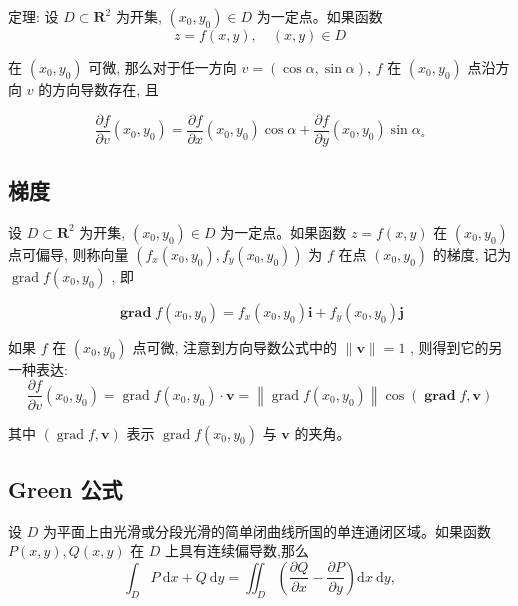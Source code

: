 \documentclass{book}
\begin{document}
定理: 设  $D \subset \mathbf{R}^{2}$  为开集,  $\left(x_{0}, y_{0}\right) \in D$  为一定点。如果函数
\begin{equation}
    z=f(x, y), \quad(x, y) \in D
\end{equation}

在  $\left(x_{0}, y_{0}\right)$  可微, 那么对于任一方向  $v=(\cos \alpha, \sin \alpha)$, $f$  在  $\left(x_{0}, y_{0}\right)$  点沿方向  $v$ 的方向导数存在, 且

\begin{equation}
    \frac{\partial f}{\partial v}\left(x_{0}, y_{0}\right)=\frac{\partial f}{\partial x}\left(x_{0}, y_{0}\right) \cos \alpha+\frac{\partial f}{\partial y}\left(x_{0}, y_{0}\right) \sin \alpha_{\circ}
\end{equation}

\subsection{梯度} 设  $D \subset \mathbf{R}^{2}$  为开集,  $\left(x_{0}, y_{0}\right) \in D$  为一定点。如果函数  $z=   f(x, y)$  在  $\left(x_{0}, y_{0}\right)$  点可偏导, 则称向量  $\left(f_{x}\left(x_{0}, y_{0}\right), f_{y}\left(x_{0}, y_{0}\right)\right)$  为  $f$  在点  $\left(x_{0}\right. ,  \left.y_{0}\right)$  的梯度, 记为  $\operatorname{grad} f\left(x_{0}, y_{0}\right)$ , 即

\begin{equation}
    \boldsymbol{\operatorname { g r a d }} f\left(x_{0}, y_{0}\right)=f_{x}\left(x_{0}, y_{0}\right) \boldsymbol{i}+f_{y}\left(x_{0}, y_{0}\right) \boldsymbol{j}
\end{equation}

如果  $f$  在  $\left(x_{0}, y_{0}\right)$ 点可微, 注意到方向导数公式中的  $\|\boldsymbol{v}\|=1$ , 则得到它的另一种表达:
\begin{equation}
    \frac{\partial f}{\partial v}\left(x_{0}, y_{0}\right)=\operatorname{grad} f\left(x_{0}, y_{0}\right) \cdot \boldsymbol{v}=\left\|\operatorname{grad} f\left(x_{0}, y_{0}\right)\right\| \cos (\boldsymbol{\operatorname { g r a d }} f, \boldsymbol{v})
\end{equation}

其中  $(\operatorname{grad} f, \boldsymbol{v})$  表示  $\operatorname{grad} f\left(x_{0}, y_{0}\right)$  与  $\boldsymbol{v}$  的夹角。

\subsection{Green 公式}
设  $D$  为平面上由光滑或分段光滑的简单闭曲线所国的单连通闭区域。如果函数  $P(x, y), Q(x, y)$  在  $D$  上具有连续偏导数,那么
\begin{equation}
    \int_{D} P \mathrm{~d} x+Q \mathrm{~d} y=\iint_{D}\left(\frac{\partial Q}{\partial x}-\frac{\partial P}{\partial y}\right) \mathrm{d} x \mathrm{~d} y,
\end{equation}
\end{document}
